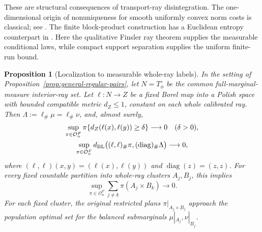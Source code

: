 \documentclass[11pt,reqno]{amsart}
\newtheorem{proposition}[theorem]{Proposition}
\theoremstyle{definition}
\theoremstyle{remark}
\numberwithin{equation}{section}
\begin{document}
These are structural consequences of transport-ray disintegration.
The one-dimensional origin of nonuniqueness for smooth uniformly
convex norm costs is classical; see
\cite[pp.~81--83]{FeldmanMcCannDensity}.
The finite block-product construction has a Euclidean entropy
counterpart in \cite[Theorem~5.2(a), equations~(5.4)--(5.6)]{NutzZhong}.
Here the qualitative Finsler ray theorem supplies the measurable
conditional laws, while compact support separation supplies the
uniform finite-run bound.

\begin{proposition}[Localization to measurable whole-ray labels]
\label{prop:general-ray-mass-localization}
In the setting of Proposition~\ref{prop:general-regular-pairs}, let
\(N=T_\phi^\circ\) be the common full-marginal-measure interior-ray
set. Let \(\ell:N\to Z\) be a fixed Borel map into a Polish space
with bounded compatible metric \(d_Z\le1\), constant on each whole
calibrated ray. Then
\(\Lambda:=\ell_\#\mu=\ell_\#\nu\), and, almost surely,
\begin{gather}
\sup_{\pi\in\mathcal O_n^F}
\pi\{d_Z(\ell(x),\ell(y))\ge\delta\}\longrightarrow0
\quad(\delta>0),
\label{eq:general-label-localization}\\
\sup_{\pi\in\mathcal O_n^F}
d_{\rm BL}\bigl((\ell,\ell)_\#\pi,
                  (\operatorname{diag})_\#\Lambda\bigr)
\longrightarrow0,
\label{eq:general-label-diagonal}
\end{gather}
where \((\ell,\ell)(x,y)=(\ell(x),\ell(y))\) and
\(\operatorname{diag}(z)=(z,z)\).
For every fixed countable partition into whole-ray clusters
\(A_j,B_j\), this implies
\[
\sup_{\pi\in\mathcal O_n^F}\sum_{j\ne k}\pi(A_j\times B_k)
\longrightarrow0.
\]
For each fixed cluster, the original restricted plans
\(\pi|_{A_j\times B_j}\) approach the population optimal set for
the balanced submarginals \(\mu|_{A_j},\nu|_{B_j}\).
\end{proposition}
\end{document}
